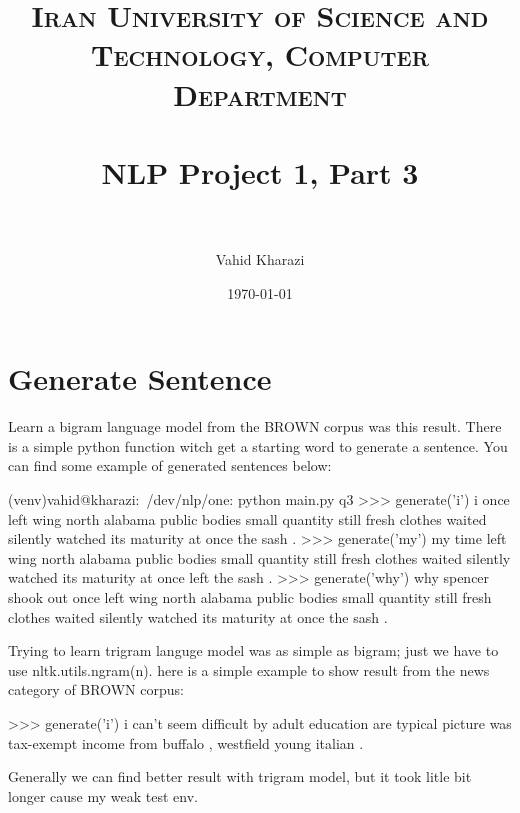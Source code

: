 \documentclass[paper=a4, fontsize=11pt]{scrartcl} %
\title{	
\normalfont \normalsize 
\textsc{Iran University of Science and Technology, Computer Department} \\ [25pt] %
\horrule{0.5pt} \\[0.4cm] %
\huge NLP Project 1, Part 3 \\ %
\horrule{2pt} \\[0.5cm] %
}
\author{Vahid Kharazi} %
\date{\normalsize\today} %
\numberwithin{equation}{section} %
\numberwithin{figure}{section} %
\numberwithin{table}{section} %
\begin{document}
\maketitle %


\section{Generate Sentence}

Learn a bigram language model from the BROWN corpus was this result. There is a simple python function witch get a starting word to generate a sentence. You can find some example of generated sentences below:

\begin{spverbatim}


(venv)vahid@kharazi:~/dev/nlp/one: python main.py q3
>>> generate('i')
i once left wing north alabama public bodies small quantity still fresh clothes waited silently watched its maturity at once the sash .
>>> generate('my')
my time left wing north alabama public bodies small quantity still fresh clothes waited silently watched its maturity at once left the sash .
>>> generate('why')
why spencer shook out once left wing north alabama public bodies small quantity still fresh clothes waited silently watched its maturity at once the sash .

\end{spverbatim}

Trying to learn trigram languge model was as simple as bigram; just we have to use nltk.utils.ngram(n). here is a simple example to show result from the news category of BROWN corpus:

\begin{spverbatim}

>>> generate('i')
i can't seem difficult by adult education are typical picture was tax-exempt income from buffalo , westfield young italian .

\end{spverbatim}

Generally we can find better result with trigram model, but it took litle bit longer cause my weak test env.
\end{document}
